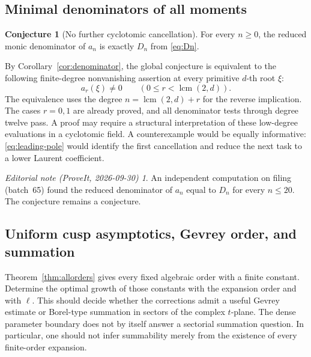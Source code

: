 \documentclass[11pt,a4paper]{article}
\numberwithin{equation}{section}
\theoremstyle{definition}
\newtheorem{conjecture}[theorem]{Conjecture}
\theoremstyle{remark}
\newtheorem*{ednote}{Editorial note (ProveIt, 2026-09-30)}
\newcommand{\lcm}{\operatorname{lcm}}
\begin{document}
\subsection{Minimal denominators of all moments}
\begin{conjecture}[No further cyclotomic cancellation]\label{conj:denominator}
For every \(n\ge0\), the reduced monic denominator of \(a_n\) is exactly \(D_n\) from \eqref{eq:Dn}.
\end{conjecture}
By Corollary~\ref{cor:denominator}, the global conjecture is equivalent to the following finite-degree nonvanishing assertion at every primitive \(d\)-th root \(\xi\):
\[
 a_r(\xi)\ne0\qquad(0\le r<\lcm(2,d)).
\]
The equivalence uses the degree \(n=\lcm(2,d)+r\) for the reverse implication. The cases \(r=0,1\) are already proved, and all denominator tests through degree twelve pass. A proof may require a structural interpretation of these low-degree evaluations in a cyclotomic field. A counterexample would be equally informative: \eqref{eq:leading-pole} would identify the first cancellation and reduce the next task to a lower Laurent coefficient.
\begin{ednote}
An independent computation on filing (batch~65) found the reduced
denominator of $a_n$ equal to $D_n$ for every $n\le20$. The conjecture
remains a conjecture.
\end{ednote}

\subsection{Uniform cusp asymptotics, Gevrey order, and summation}
Theorem~\ref{thm:allorders} gives every fixed algebraic order with a finite constant. Determine the optimal growth of those constants with the expansion order and with \(\ell\). This should decide whether the corrections admit a useful Gevrey estimate or Borel-type summation in sectors of the complex \(t\)-plane. The dense parameter boundary does not by itself answer a sectorial summation question. In particular, one should not infer summability merely from the existence of every finite-order expansion.
\end{document}
